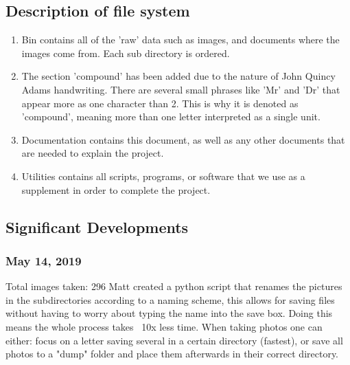 \documentclass[12pt]{article} %
\begin{document}
\subsection{Description of file system}
\begin{enumerate}[label = (\roman*)]
\item Bin contains all of the 'raw' data such as images, and documents where the images come from. Each sub directory is ordered.
\item The section 'compound' has been added due to the nature of John Quincy Adams handwriting. There are several small phrases like 'Mr' and 'Dr' that appear more as one character than 2. This is why it is denoted as 'compound', meaning more than one letter interpreted as a single unit.
\item Documentation contains this document, as well as any other documents that are needed to explain the project.
\item Utilities contains all scripts, programs, or software that we use as a supplement in order to complete the project.
\end{enumerate}

\subsection{Significant Developments}
\subsubsection{May 14, 2019}
Total images taken: 296\newline
\noindent\makebox[\linewidth]{\rule{15cm}{0.4pt}}
Matt created a python script that renames the pictures in the subdirectories according to a naming scheme, this allows for saving files without having to worry about typing the name into the save box. Doing this means the whole process takes ~10x less time. When taking photos one can either: focus on a letter saving several in a certain directory (fastest), or save all photos to a "dump" folder and place them afterwards in their correct directory.
\end{document}
